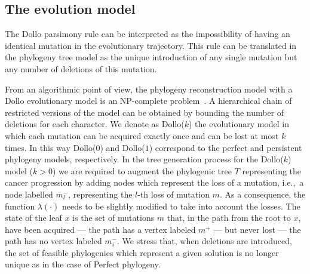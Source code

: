 \documentclass[a4paper,USenglish]{article}
\newcommand{\ie}{i.e.,~}
\theoremstyle{definition}
\begin{document}
\subsection{The evolution model}
\label{sec:intro_dollok}
The Dollo parsimony rule can be interpreted as the impossibility of 
having an identical mutation in the
evolutionary trajectory.
This rule can be translated in the phylogeny tree model as the unique introduction of 
any single mutation but any number of deletions of this mutation. 

From an algorithmic point of view,
the phylogeny reconstruction model 
with a Dollo evolutionary model is 
an NP-complete problem~\cite{BKW95,DAY198633}.
A hierarchical chain of restricted versions of the model can be obtained by bounding the number of deletions for each character.
We denote as Dollo($k$) the evolutionary model in which each mutation can be acquired exactly once and can be lost at most $k$ times. 
In this way Dollo($0$) and Dollo($1$) correspond to the perfect and persistent phylogeny models, respectively.
In the tree generation process for the Dollo($k$) model ($k>0$) we are required to augment
the phylogenic tree $T$ representing the cancer progression by adding nodes which
represent the loss of a mutation, \ie a node labelled $m^-_l$, representing the $l$-th
loss of mutation $m$.  
As a consequence, the function $\lambda(\cdot)$ needs to be slightly modified to take into
account the losses.
The state of the leaf $x$ is  the set of  mutations $m$ that, in the path from the root to
$x$, have been acquired --- the path has a vertex labeled $m^{+}$ --- but never lost ---
the path has no vertex labeled $m_{i}^{-}$.
We stress  that, when deletions are introduced, 
the set of feasible phylogenies which represent a given solution is no longer unique as in
the case of Perfect phylogeny.
\end{document}
